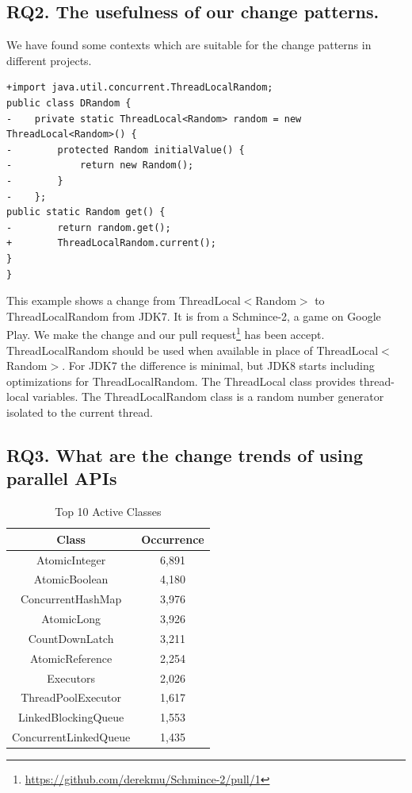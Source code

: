 \subsection{RQ2. The usefulness of our change patterns.}
\label{sec:result:sample}



 We have found some contexts which are suitable for the change patterns in different projects.

\begin{lstlisting}
+import java.util.concurrent.ThreadLocalRandom;
public class DRandom {
-    private static ThreadLocal<Random> random = new ThreadLocal<Random>() {
-        protected Random initialValue() {
-            return new Random();
-        }
-    };
public static Random get() {
-        return random.get();
+        ThreadLocalRandom.current();
}
}
\end{lstlisting}

This example shows a change from ThreadLocal$<$Random$>$ to ThreadLocalRandom from JDK7. It is from a Schmince-2, a game on Google Play. We make the change and our pull request\footnote{\url{https://github.com/derekmu/Schmince-2/pull/1}} has been accept. ThreadLocalRandom should be used when available in place of ThreadLocal$<$Random$>$. For JDK7 the difference is minimal, but JDK8 starts including optimizations for ThreadLocalRandom. The ThreadLocal class provides thread-local variables. The ThreadLocalRandom class is a random number generator isolated to the current thread.

\subsection{RQ3. What are the change trends of using parallel APIs}
\label{sec:result:trend}
\begin{table}
	\centering
	\caption{Top 10 Active Classes}
\label{table:topapi}
	\begin{tabular}{|c|c|}\hline
		Class&Occurrence\\\hline
		AtomicInteger&6,891\\
		AtomicBoolean&4,180\\
		ConcurrentHashMap&3,976\\
		AtomicLong&3,926\\
		CountDownLatch&3,211\\
		AtomicReference&2,254\\
		Executors&2,026\\
		ThreadPoolExecutor&1,617\\
		LinkedBlockingQueue&1,553\\
		ConcurrentLinkedQueue&1,435\\\hline
	\end{tabular}
\end{table}

